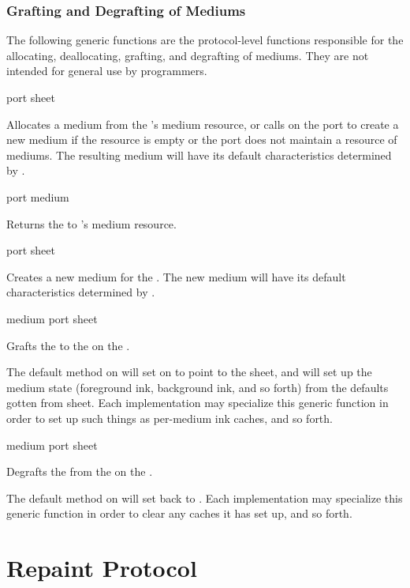 \subsubsection {Grafting and Degrafting of Mediums}

The following generic functions are the protocol-level functions responsible for
the allocating, deallocating, grafting, and degrafting of mediums.  They are not
intended for general use by programmers.

 {port sheet}

Allocates a medium from the  's medium resource, or calls
 on the port to create a new medium if the resource is empty or
the port does not maintain a resource of mediums.  The resulting medium will
have its default characteristics determined by .

 {port medium} 

Returns the   to 's medium resource.

 {port sheet}

Creates a new medium for the  .  The new medium will have
its default characteristics determined by .

 {medium port sheet}

Grafts the   to the   on the
 .  

The default method on  will set  on
 to point to the sheet, and will set up the medium state (foreground
ink, background ink, and so forth) from the defaults gotten from {sheet}.  Each
implementation may specialize this generic function in order to set up such
things as per-medium ink caches, and so forth.

 {medium port sheet} 

Degrafts the   from the   on the
 .

The default method on  will set  back to
.  Each implementation may specialize this generic function in order to
clear any caches it has set up, and so forth.


\section {Repaint Protocol}

